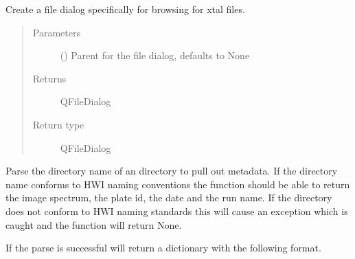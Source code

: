 \documentclass[letterpaper,10pt,english]{sphinxmanual}
\begin{document}
\begin{fulllineitems}

\begin{fulllineitems}
\label{\detokenize{polo.utils:polo.utils.io_utils.RunImporter.make_xtal_file_dialog}}
Create a file dialog specifically for browsing for
xtal files.
\begin{quote}\begin{description}
\item[{Parameters}] \leavevmode
{} (\sphinxstyleliteralemphasis{\sphinxupquote{, }}) \textendash{} Parent for the file dialog, defaults to None

\item[{Returns}] \leavevmode
QFileDialog

\item[{Return type}] \leavevmode
QFileDialog

\end{description}\end{quote}

\end{fulllineitems}


\begin{fulllineitems}
\label{\detokenize{polo.utils:polo.utils.io_utils.RunImporter.parse_hwi_dir_metadata}}
Parse the directory name of an  directory to pull out
metadata. If the directory name conforms to HWI naming conventions
the function should be able to return the image spectrum, the plate id,
the date and the run name. If the directory does not conform to HWI
naming standards this will cause an exception which is caught and the
function will return None.

If the parse is successful will return a dictionary with the following
format.
\begin{quote}


\end{quote}
\end{fulllineitems}
\end{fulllineitems}
\end{document}

